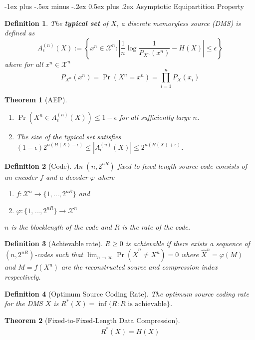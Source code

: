 \documentclass[frenchspacing,9pt,landscape,a4paper]{article}
\makeatletter
\renewcommand{\section}{\@startsection{section}{1}{0mm}%
                                {-1ex plus -.5ex minus -.2ex}%
                                {0.5ex plus .2ex}%
                                {\normalfont\large\bfseries}}
\newcommand{\abs}[1]{\left\lvert #1 \right\rvert}
\DeclareMathOperator{\pr}{Pr}
\newtheorem*{thm}{Theorem}
\newtheorem*{defn}{Definition}
\makeatother
\begin{document}
\begin{multicols}{4}
\section{Asymptotic Equipartition Property}
\begin{defn}
    The \textbf{typical set} of $X$, a discrete memoryless source (DMS) is defined as 
    \[A_\epsilon^{(n)}(X):=\left\{x^n\in\mathcal{X}^n:\abs{\frac{1}{n}\log
    \frac{1}{P_{X^n}(x^n)}-H(X)}\leq\epsilon\right\}\] where for all $x^n\in\mathcal{X}^n$
    \[P_{X^n}(x^n)=\pr(X^n=x^n)=\prod_{i=1}^n P_X(x_i)\]
\end{defn}
\begin{thm}[AEP]
    \begin{enumerate}
        \item $\pr(X^n\in A_\epsilon^{(n)}(X))\leq 1-\epsilon$ for all sufficiently large  $n$.
        \item The size of the typical set satisfies
            $(1-\epsilon)2^{n(H(X)-\epsilon)}\leq\abs{A_\epsilon^{(n)}(X)}\leq 2^{n(H(X)+\epsilon)}$.
    \end{enumerate}
\end{thm}
\begin{defn}[Code]
    An $(n,2^{nR})$-fixed-to-fixed-length source code consists of an encoder  $f$ and a decoder  $\varphi$
    where
    \begin{enumerate}
        \item $f:\mathcal{X}^n\to\{1,\dots,2^{nR}\}$ and
        \item  $\varphi:\{1,\dots,2^{nR}\}\to\mathcal{X}^n$
    \end{enumerate} $n$ is the blocklength of the code and  $R$ is the rate of the code.
\end{defn}
\begin{defn}[Achievable rate]
    $R\geq 0$ is achievable if there exists a sequence of  $(n,2^{nR})$-codes such that
    $\lim_{n\to\infty}\pr(\hat{X}^n\neq X^n)=0$ where  $\hat{X}^n=\varphi(M)$ and  $M=f(X^n)$ are the
    reconstructed source and compression index respectively.
\end{defn}
\begin{defn}[Optimum Source Coding Rate]
    The optimum source coding rate for the DMS $X$ is $R^*(X)=\inf\{R:R\text{ is achievable}\}$.
\end{defn}
\begin{thm}[Fixed-to-Fixed-Length Data Compression]
    \begin{align*}
        R^*(X)=H(X) 
    \end{align*}

\end{thm}
\end{multicols}
\end{document}
